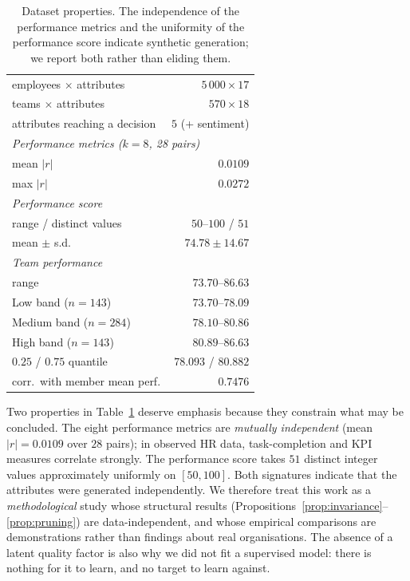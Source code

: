 \documentclass[conference]{IEEEtran}
\begin{document}
\begin{table}[t]
\caption{Dataset properties. The independence of the performance metrics and the
uniformity of the performance score indicate synthetic generation; we report both
rather than eliding them.}
\label{tab:data}
\centering\small
\begin{tabular}{lr}
\toprule
employees $\times$ attributes & $5\,000\times17$\\
teams $\times$ attributes & $570\times18$\\
attributes reaching a decision & $5$ (+ sentiment)\\
\midrule
\multicolumn{2}{l}{\emph{Performance metrics ($k=8$, 28 pairs)}}\\
\quad mean $|r|$ & $0.0109$\\
\quad max $|r|$ & $0.0272$\\
\midrule
\multicolumn{2}{l}{\emph{Performance score}}\\
\quad range / distinct values & $50$--$100$ / $51$\\
\quad mean $\pm$ s.d. & $74.78\pm14.67$\\
\midrule
\multicolumn{2}{l}{\emph{Team performance}}\\
\quad range & $73.70$--$86.63$\\
\quad Low band ($n=143$) & $73.70$--$78.09$\\
\quad Medium band ($n=284$) & $78.10$--$80.86$\\
\quad High band ($n=143$) & $80.89$--$86.63$\\
\quad $0.25$ / $0.75$ quantile & $78.093$ / $80.882$\\
\quad corr.\ with member mean perf. & $0.7476$\\
\bottomrule
\end{tabular}
\end{table}

Two properties in Table~\ref{tab:data} deserve emphasis because they constrain
what may be concluded. The eight performance metrics are \emph{mutually
independent} (mean $|r|=0.0109$ over $28$ pairs); in observed HR data,
task-completion and KPI measures correlate strongly. The performance score takes
$51$ distinct integer values approximately uniformly on $[50,100]$. Both
signatures indicate that the attributes were generated independently. We
therefore treat this work as a \emph{methodological} study whose structural
results (Propositions~\ref{prop:invariance}--\ref{prop:pruning}) are
data-independent, and whose empirical comparisons are demonstrations rather than
findings about real organisations. The absence of a latent quality factor is also
why we did not fit a supervised model: there is nothing for it to learn, and no
target to learn against.
\end{document}
